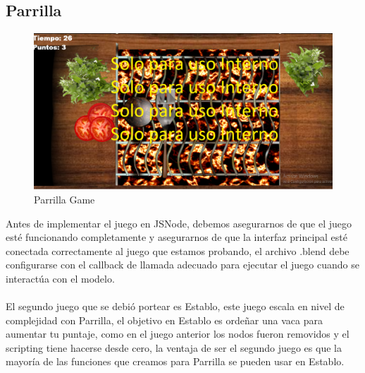 \documentclass{article}
\begin{document}
\subsection{Parrilla}
\begin{figure}[h]
    \centering
    \includegraphics[scale=0.25]{parrilla.png}
    \caption{Parrilla Game }
    \label{parrilla}
\end{figure}
Antes de implementar el juego en JSNode, debemos asegurarnos de que el juego esté funcionando completamente y asegurarnos de que la interfaz principal esté conectada correctamente al juego que estamos probando, el archivo .blend debe configurarse con el callback de llamada adecuado para ejecutar el juego cuando se interactúa con el modelo. \\
\\
El segundo juego que se debió portear es Establo, este juego escala en nivel de complejidad con Parrilla, el objetivo en Establo es ordeñar una vaca para aumentar tu puntaje, como en el juego anterior los nodos fueron removidos y el scripting tiene hacerse desde cero, la ventaja de ser el segundo juego es que la mayoría de las funciones que creamos para Parrilla se pueden usar en Establo.
\\
\end{document}

